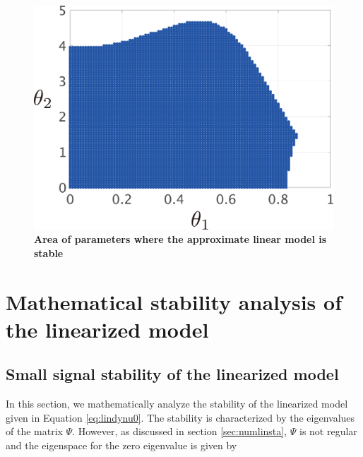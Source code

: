 \documentclass[graybox, envcountchap]{svmult}
\begin{document}
\begin{figure}[t!]
{\begin{minipage}{0.49\linewidth}
    \medskip
  \end{minipage}
  \begin{minipage}{0.49\linewidth}
    \centering
    \includegraphics[width = 0.90\linewidth]{figs/Y0.01D0.01}
    \medskip
  \end{minipage}
}
 \caption{\textbf{Area of parameters where the approximate linear model is stable}}
 \label{fig:stacheck}
\medskip
\end{figure}


\section{Mathematical stability analysis of the linearized
model}\label{sec:linmathana}

\subsection{Small signal stability of the linearized model}
In this section, we mathematically analyze the stability of the linearized model
given in Equation \ref{eq:lindynu0}. The stability is characterized by the
eigenvalues of the matrix $\Psi$. However, as discussed in section
\ref{sec:numlinsta}, $\Psi$ is not regular and the eigenspace for the zero
eigenvalue is given by
\end{document}
